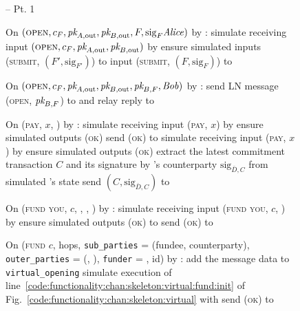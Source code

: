 \begin{figure}[H]
  \begin{simulatorbox}{\simulator -- Pt. 1}
    \begin{algorithmic}[1]
      \State On $(\textsc{open}, c_F, \textit{pk}_{A, \mathrm{out}}, \textit{pk}_{B,
      \mathrm{out}}, F, \mathrm{sig}_F \mathit{Alice})$ by \fchan: 
      \Indent
        \State simulate \alice receiving input $(\textsc{open}, c_F, \textit{pk}_{A,
        \mathrm{out}}, \textit{pk}_{B, \mathrm{out}})$ by \environment
        \State ensure simulated \alice inputs (\textsc{submit}, $(F',
        \mathrm{sig}_{F'})$) to \ledger
        \State input (\textsc{submit}, $(F, \mathrm{sig}_F)$) to \ledger
      \EndIndent
      \Statex

      \State On $(\textsc{open}, c_F, \textit{pk}_{A, \mathrm{out}}, \textit{pk}_{B,
      \mathrm{out}}, \textit{pk}_{B, F}, \mathit{Bob})$ by \fchan: 
      \Indent
        \State send LN message (\textsc{open}, $\textit{pk}_{B, F}$) to \alice and relay
        reply to \fchan {}
      \EndIndent
      \Statex

      \State On (\textsc{pay}, $x$, \dave) by \fchan:
      \Indent
          \State simulate \dave receiving input (\textsc{pay}, $x$) by
          \environment
          \State ensure simulated \dave outputs (\textsc{ok})
          \State send (\textsc{ok}) to \fchan
         
          \State simulate \dave receiving input (\textsc{pay}, $x$) by
          \environment
          \State ensure simulated \dave outputs (\textsc{ok})
          \State extract the latest commitment transaction $C$ and its signature
          by \dave's counterparty $\mathrm{sig}_{\bar{D}, C}$ from simulated
          \dave's state
          \State send $(C, \mathrm{sig}_{\bar{D}, C})$ to \fchan
        \EndIf
      \EndIndent
      \Statex

      \State On (\textsc{fund you}, $c$, \bob, \charlie, \alice) by \fchan:
      \Indent
        \State simulate \alice receiving input (\textsc{fund you}, $c$, \bob) by
        \charlie
        \State ensure simulated \alice outputs (\textsc{ok}) to \charlie
        \State send (\textsc{ok}) to \fchan
      \EndIndent
      \Statex

      \State On (\textsc{fund} $c$, hops, \texttt{sub\_parties} = (fundee,
      counterparty), \texttt{outer\_parties} = (\charlie, \dave),
      \texttt{funder} = \alice, id) by \fchan:
      \label{code:simulator:fund}
      \Indent
        \State add the message data to \texttt{virtual\_opening}
        \State simulate execution of
        line~\ref{code:functionality:chan:skeleton:virtual:fund:init} of
        Fig.~\ref{code:functionality:chan:skeleton:virtual} with \alice
        \State send (\textsc{ok}) to \fchan
        \label{code:simulator:fund:ok}
      \EndIndent
      \Statex


\end{algorithmic}
\end{simulatorbox}
\end{figure}
